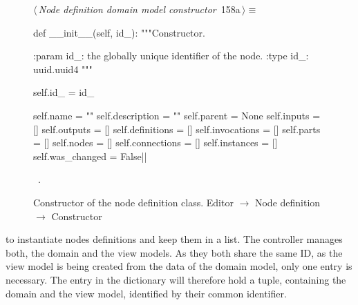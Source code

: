 \documentclass[%
    a4paper,    %
    justified,  %
    nobib,      %
    openany     %
]{tufte-book}
\makeatletter
\renewcommand{\label}[1]{\@tufte@label{##1}}%
\makeatother
\begin{document}
\begin{figure}[!htbp]
\begin{flushleft} \small
\begin{minipage}{\linewidth}\label{scrap120}\raggedright\small
{} $\langle\,${\itshape Node definition domain model constructor}\nobreak\ {\footnotesize {158a}}$\,\rangle\equiv$
\vspace{-1ex}
\begin{pythoncode}
def __init__(self, id_):
    """Constructor.

    :param id_: the globally unique identifier of the node.
    :type  id_: uuid.uuid4
    """

    self.id_         = id_

    self.name        = ""
    self.description = ""
    self.parent      = None
    self.inputs      = []
    self.outputs     = []
    self.definitions = []
    self.invocations = []
    self.parts       = []
    self.nodes       = []
    self.connections = []
    self.instances   = []
    self.was_changed = False|\NWsep|
\end{pythoncode}
\vspace{1.5ex}
\footnotesize
\begin{list}{}{\setlength{\itemsep}{-\parsep}\setlength{\itemindent}{-\leftmargin}}
\item \NWtxtMacroRefIn\ .

\item{}
\end{list}
\end{minipage}\vspace{4ex}
\end{flushleft}
\caption{Constructor of the node definition class.
  \newline{}\newline{}Editor $\rightarrow$ Node definition $\rightarrow$
  Constructor}
\end{figure}

 to instantiate nodes definitions
and keep them in a list. The controller manages both, the domain and the view
models. As they both share the same ID, as the view model is being created from
the data of the domain model, only one entry is necessary. The entry in the
dictionary will therefore hold a tuple, containing the domain and the view
model, identified by their common identifier.
\end{document}

